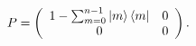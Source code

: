 \begin{equation}
P=\left(
\begin{array}
[c]{cc}%
1-\sum_{m=0}^{n-1}\left\vert m\right\rangle \left\langle m\right\vert & 0\\
0 & 0
\end{array}
\right) . \label{P1}%
\end{equation}

